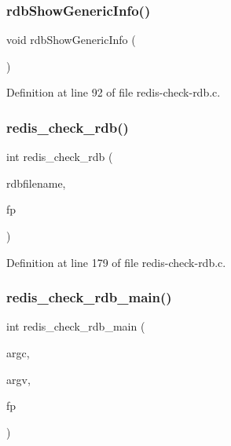 \subsubsection{\texorpdfstring{rdb\+Show\+Generic\+Info()}{rdbShowGenericInfo()}}
{\footnotesize\ttfamily void rdb\+Show\+Generic\+Info (\begin{DoxyParamCaption}\item[{void}]{ }\end{DoxyParamCaption})}



Definition at line 92 of file redis-\/check-\/rdb.\+c.

\mbox{\label{redis-check-rdb_8c_a155ad3442a606e949db548e697727447}} 
\subsubsection{\texorpdfstring{redis\+\_\+check\+\_\+rdb()}{redis\_check\_rdb()}}
{\footnotesize\ttfamily int redis\+\_\+check\+\_\+rdb (\begin{DoxyParamCaption}\item[{char $\ast$}]{rdbfilename,  }\item[{F\+I\+LE $\ast$}]{fp }\end{DoxyParamCaption})}



Definition at line 179 of file redis-\/check-\/rdb.\+c.

\mbox{\label{redis-check-rdb_8c_ac45f6a1c394687c26b8f0261661006e3}} 
\subsubsection{\texorpdfstring{redis\+\_\+check\+\_\+rdb\+\_\+main()}{redis\_check\_rdb\_main()}}
{\footnotesize\ttfamily int redis\+\_\+check\+\_\+rdb\+\_\+main (\begin{DoxyParamCaption}\item[{int}]{argc,  }\item[{char $\ast$$\ast$}]{argv,  }\item[{F\+I\+LE $\ast$}]{fp }\end{DoxyParamCaption})}



